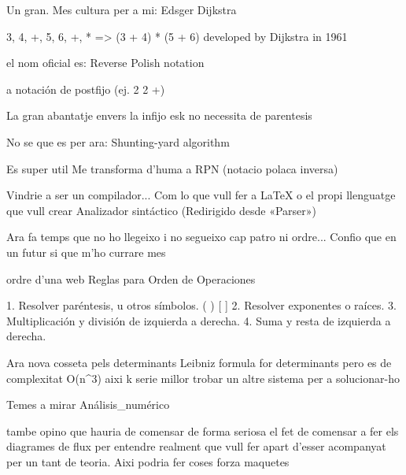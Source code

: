 

Un gran. Mes cultura per a mi:
	Edsger Dijkstra



3, 4, +, 5, 6, +, * => (3 + 4) * (5 + 6)
developed by Dijkstra in 1961

el nom oficial es:
Reverse Polish notation

a notación de postfijo (ej. 2 2 +)

La gran abantatje envers la infijo esk no necessita de parentesis



No se que es per ara:
Shunting-yard algorithm

Es super util
Me transforma d'huma a RPN (notacio polaca inversa)



Vindrie a ser un compilador... Com lo que vull fer a LaTeX o el propi llenguatge que vull crear
Analizador sintáctico
(Redirigido desde «Parser»)


Ara fa temps que no ho llegeixo i no segueixo cap patro ni ordre...
Confio que en un futur si que m'ho currare mes

ordre d'una web
Reglas para Orden de Operaciones

1. Resolver paréntesis, u otros símbolos. ( )  [ ]  { }
2. Resolver exponentes o raíces.
3. Multiplicación y división de izquierda a derecha.
4. Suma y resta de izquierda a derecha. 


Ara nova cosseta pels determinants
Leibniz formula for determinants
pero es de complexitat O(n^3)
aixi k serie millor trobar un altre sistema per a solucionar-ho

Temes a mirar
Análisis_numérico


tambe opino que hauria de comensar de forma seriosa el fet de comensar a fer els diagrames de flux per entendre realment que vull fer
apart d'esser acompanyat per un tant de teoria.
Aixi podria fer coses forza maquetes
